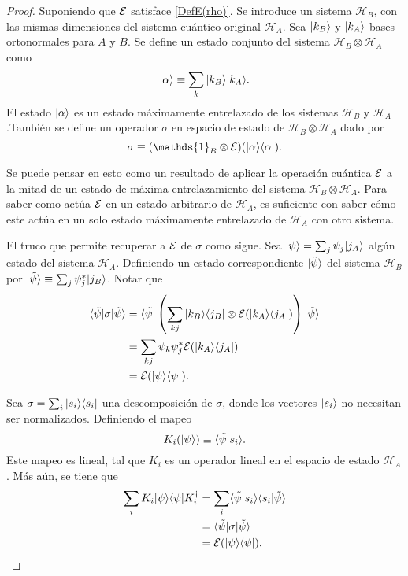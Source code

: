 \begin{proof}
Suponiendo que $\mathcal{E}$ satisface {\ref{DefE(rho)}}. Se introduce un sistema $\mathcal{H}_B$, con las mismas dimensiones del sistema cuántico original $\mathcal{H}_A$. Sea $|k_B\rangle$ y $|k_A\rangle$ bases ortonormales para $A$ y $B$. Se define un estado conjunto del sistema $\mathcal{H}_B\otimes \mathcal{H}_A$ como \[|\alpha\rangle \equiv \sum_k |k_B\rangle |k_A\rangle.\] El estado $|\alpha\rangle $ es un estado máximamente entrelazado de los sistemas $\mathcal{H}_B$ y $\mathcal{H}_A$.También se define un operador $\sigma$ en espacio de estado de $\mathcal{H}_B\otimes \mathcal{H}_A$ dado por 
\begin{equation}\label{sigma1}
    \sigma \equiv (\mathds{1}_B\otimes\E)(|\alpha\rala \alpha|).
\end{equation}


Se puede pensar en esto como un resultado de aplicar la operación cuántica $\mathcal{E}$ a la mitad de un estado de máxima entrelazamiento del sistema $\mathcal{H}_B\otimes \mathcal{H}_A$. Para saber como actúa $\mathcal{E}$ en un estado arbitrario de $\mathcal{H}_A$, es suficiente con saber cómo este actúa en un solo estado máximamente entrelazado de $\mathcal{H}_A$ con otro sistema.

El truco que permite recuperar a $\mathcal{E}$ de $\sigma$ como sigue. Sea $|\psi\rangle=\sum_j \psi_j |j_A\rangle$ algún estado del sistema $\mathcal{H}_A$. Definiendo un estado correspondiente $|\tilde{\psi}\rangle$ del sistema $\mathcal{H}_B$ por $|\tilde{\psi}\rangle \equiv \sum_j \psi_j^*|j_B\rangle$. Notar que
\begin{equation}
    \begin{split}
        \langle \tilde \psi |\sigma |\tilde{\psi}\rangle&= \langle \tilde \psi |\left(\sum_{kj} |k_B\rangle \langle j_B|\otimes\mathcal{E} (|k_A \rangle \langle j_A|)\right) |\tilde{\psi}\rangle\\
        &=\sum_{kj} \psi_k \psi_j^* \mathcal{E} (|k_A \rangle \langle j_A|)\\
        &=\mathcal{E}(|\psi\rangle \langle\psi|).
    \end{split}
\end{equation}


Sea $\sigma=\sum_i|s_i\rangle \langle s_i|$ una descomposición de $\sigma$, donde los vectores $|s_i\rangle$ no necesitan ser normalizados. Definiendo el mapeo \[K_i(|\psi\rangle) \equiv \langle\tilde{\psi}|s_i\rangle.\] Este mapeo es lineal, tal que $K_i$ es un operador lineal en el espacio de estado $\mathcal{H}_A$. Más aún, se tiene que 
\begin{equation}
    \begin{split}
       \sum_i K_i |\psi \rangle \langle \psi |K_i^\dagger&=\sum_i  \langle\tilde{\psi}|s_i\rangle \langle s_i|\tilde{\psi}\rangle\\
        &=\langle \tilde \psi |\sigma |\tilde{\psi}\rangle\\
        &=\mathcal{E}(|\psi \rangle \langle\psi|).\\
    \end{split}
\end{equation}




\end{proof}
